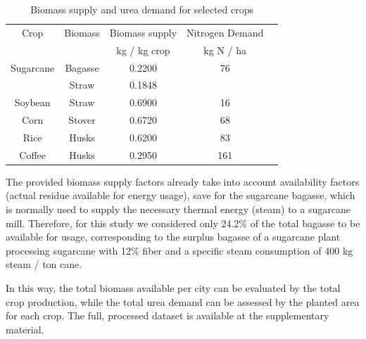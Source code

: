 \documentclass[a4paper, titlepage]{article}
\begin{document}
\begin{table}
    \centering
    \caption{Biomass supply and urea demand for selected crops}
    \label{tab_biomasssupply}
    \begin{tabular}{|c | c | c | c | c|}
        \hline
        Crop      & Biomass & Biomass supply \cite{souzaTheoreticalTechnicalAssessment2021} & Nitrogen Demand \cite{IFASTATFertilizerUse2024} \\
                  &         & kg / kg crop                                                  & kg N / ha                                       \\
        \hline
        Sugarcane & Bagasse & 0.2200                                                        & 76                                              \\
                  & Straw   & 0.1848                                                        &                                                 \\
        Soybean   & Straw   & 0.6900                                                        & 16                                              \\
        Corn      & Stover  & 0.6720                                                        & 68                                              \\
        Rice      & Husks   & 0.6200                                                        & 83                                              \\
        Coffee    & Husks   & 0.2950                                                        & 161                                             \\
        \hline
    \end{tabular}
\end{table}

The provided biomass supply factors already take into account availability factors (actual residue available for energy
usage), save for the sugarcane bagasse, which is normally used to supply the necessary thermal energy (steam)
to a sugarcane mill. Therefore, for this study we considered only 24.2\% of the total bagasse to be available for
usage, corresponding to the surplus bagasse of a sugarcane plant processing sugarcane with 12\% fiber and a specific
steam consumption of 400 kg steam / ton cane.

In this way, the total biomass available per city can be evaluated by the total crop production, while the total urea
demand can be assessed by the planted area for each crop. The full, processed dataset is available at the supplementary
material.
\end{document}
